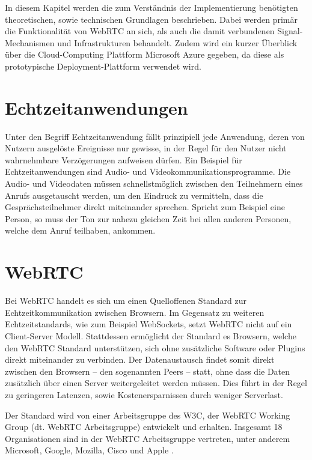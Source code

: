 In diesem Kapitel werden die zum Verständnis der Implementierung benötigten theoretischen, sowie technischen Grundlagen beschrieben. Dabei werden primär die Funktionalität von WebRTC an sich, als auch die damit verbundenen Signal-Mechanismen und Infrastrukturen behandelt. Zudem wird ein kurzer Überblick über die Cloud-Computing Plattform Microsoft Azure gegeben, da diese als prototypische Deployment-Plattform verwendet wird.

\section{Echtzeitanwendungen}
Unter den Begriff Echtzeitanwendung fällt prinzipiell jede Anwendung, deren von Nutzern ausgelöste Ereignisse nur gewisse, in der Regel für den Nutzer nicht wahrnehmbare Verzögerungen aufweisen dürfen. Ein Beispiel für Echtzeitanwendungen sind Audio- und Videokommunikationsprogramme. Die Audio- und Videodaten müssen schnellstmöglich zwischen den Teilnehmern eines Anrufs ausgetauscht werden, um den Eindruck zu vermitteln, dass die Gesprächsteilnehmer direkt miteinander sprechen. Spricht zum Beispiel eine Person, so muss der Ton zur nahezu gleichen Zeit bei allen anderen Personen, welche dem Anruf teilhaben, ankommen.

\section{WebRTC}
Bei \ac{WebRTC} handelt es sich um einen Quelloffenen Standard zur Echtzeitkommunikation zwischen Browsern. Im Gegensatz zu weiteren Echtzeitstandards, wie zum Beispiel WebSockets, setzt \acs{WebRTC} nicht auf ein Client-Server Modell. Stattdessen ermöglicht der Standard es Browsern, welche den \acs{WebRTC} Standard unterstützen, sich ohne zusätzliche Software oder Plugins direkt miteinander zu verbinden. Der Datenaustausch findet somit direkt zwischen den Browsern -- den sogenannten Peers -- statt, ohne dass die Daten zusätzlich über einen Server weitergeleitet werden müssen. Dies führt in der Regel zu geringeren Latenzen, sowie Kostenersparnissen durch weniger Serverlast.\par

Der Standard wird von einer Arbeitsgruppe des \acs{W3C}, der \acs{WebRTC} Working Group (dt. WebRTC Arbeitsgruppe) entwickelt und erhalten. Insgesamt 18 Organisationen sind in der WebRTC Arbeitsgruppe vertreten, unter anderem Microsoft, Google, Mozilla, Cisco und Apple \cite{webRTCWorkingGroup}.\par

